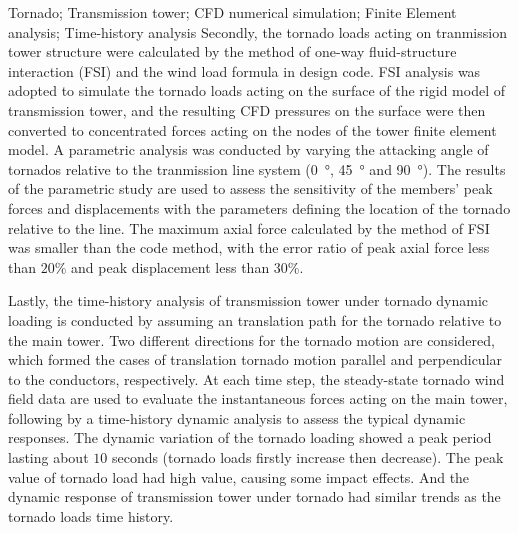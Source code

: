 \begin{englishabstract}{Tornado; Transmission tower; CFD numerical simulation; Finite Element analysis; Time-history analysis }
  Secondly, the tornado loads acting on tranmission tower structure were calculated by the method of one-way fluid-structure interaction (FSI) and the wind load formula in design code.
  FSI analysis was adopted to simulate the tornado loads acting on the surface of the rigid model of transmission tower, and the resulting CFD pressures on the surface were then converted to concentrated forces acting on the nodes of the tower finite element model.
  A parametric analysis was conducted by varying the attacking angle of tornados relative to the tranmission line system (\SI{0}{\degree}, \SI{45}{\degree} and \SI{90}{\degree}).
  The results of the parametric study are used to assess the sensitivity of the members' peak forces and displacements with the parameters defining the location of the tornado relative to the line.
  The maximum axial force calculated by the method of FSI was smaller than the code method, with the error ratio of peak axial force less than $20\%$ and peak displacement less than $30\%$.

  Lastly, the time-history analysis of transmission tower under tornado dynamic loading is conducted by assuming an translation path for the tornado relative to the main tower.
  Two different directions for the tornado motion are considered, which formed the cases of translation tornado motion parallel and perpendicular to the conductors, respectively.
  At each time step, the steady-state tornado wind field data are used to evaluate the instantaneous forces acting on the main tower, following by a time-history dynamic analysis to assess the typical dynamic responses.
  The dynamic variation of the tornado loading showed a peak period lasting about $10$ seconds (tornado loads firstly increase then decrease).
  The peak value of tornado load had high value, causing some impact effects.
  And the dynamic response of transmission tower under tornado had similar trends as the tornado loads time history.
  
\end{englishabstract}


